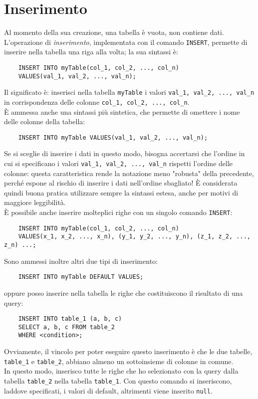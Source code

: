 \documentclass[12pt,a4paper]{book}
\begin{document}
	\section{Inserimento}
	Al momento della sua creazione, una tabella è vuota, non contiene dati.\\L'operazione di \textit{inserimento}, implementata con il comando \texttt{INSERT}, permette di inserire nella tabella una riga alla volta; la sua sintassi è:
	\begin{lstlisting}
	INSERT INTO myTable(col_1, col_2, ..., col_n)
	VALUES(val_1, val_2, ..., val_n);
	\end{lstlisting}
	Il significato è: inserisci nella tabella \texttt{myTable} i valori \texttt{val_1, val_2, ..., val_n} in corrispondenza delle colonne \texttt{col_1, col_2, ..., col_n}.\\
	È ammessa anche una sintassi più sintetica, che permette di omettere i nome delle colonne della tabella:
	\begin{lstlisting}
	INSERT INTO myTable VALUES(val_1, val_2, ..., val_n);
	\end{lstlisting}
	Se si sceglie di inserire i dati in questo modo, bisogna accertarsi che l'ordine in cui si specificano i valori \texttt{val_1, val_2, ..., val_n} rispetti l'ordine delle colonne: questa caratteristica rende la notazione meno "robusta" della precedente, perché espone al rischio di inserire i dati nell'ordine sbagliato! È considerata quindi buona pratica utilizzare sempre la sintassi estesa, anche per motivi di maggiore leggibilità.\\
	È possibile anche inserire molteplici righe con un singolo comando \texttt{INSERT}:
	\begin{lstlisting}
	INSERT INTO myTable(col_1, col_2, ..., col_n)
	VALUES(x_1, x_2, ..., x_n), (y_1, y_2, ..., y_n), (z_1, z_2, ..., z_n) ...;
	\end{lstlisting}
	Sono ammessi inoltre altri due tipi di inserimento:
	\begin{lstlisting}
	INSERT INTO myTable DEFAULT VALUES;
	\end{lstlisting}
	oppure posso inserire nella tabella le righe che costituiscono il risultato di una query:
	\begin{lstlisting}
	INSERT INTO table_1 (a, b, c)
	SELECT a, b, c FROM table_2
	WHERE <condition>;
	\end{lstlisting}
	Ovviamente, il vincolo per poter eseguire questo inserimento è che le due tabelle, \texttt{table_1} e \texttt{table_2}, abbiano almeno un sottoinsieme di colonne in comune.\\In questo modo, inserisco tutte le righe che ho selezionato con la query dalla tabella \texttt{table_2} nella tabella \texttt{table_1}.
	Con questo comando si inseriscono, laddove specificati, i valori di default, altrimenti viene inserito \texttt{null}.\\
\end{document}

